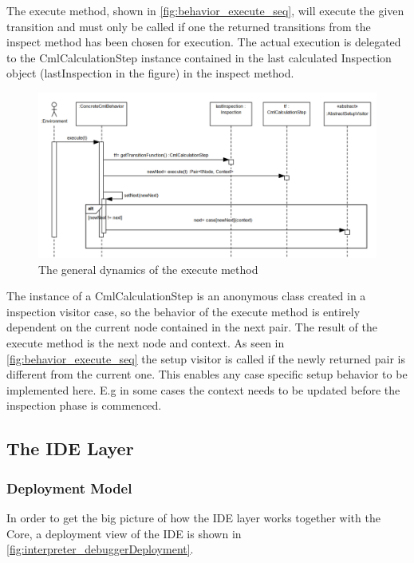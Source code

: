 \documentclass[a4paper, 10pt]{include/compassreport}   %
\begin{document}
The execute method, shown in \autoref{fig:behavior_execute_seq}, will
execute the given transition and must only be called if one the
returned transitions from the inspect method has been chosen for
execution. The actual execution is delegated to the CmlCalculationStep
instance contained in the last calculated Inspection object
(lastInspection in the figure) in the inspect method.
\begin{figure}[ht!]
  \begin{center}
    \includegraphics[width=1\textwidth]{figures/behavior-execute-seq}
    \caption{The general dynamics of the execute method}
    \label{fig:behavior_execute_seq}
  \end{center}
\end{figure}
The instance of a CmlCalculationStep is an anonymous class created in
a inspection visitor case, so the behavior of the execute method is
entirely dependent on the current node contained in the next pair. The
result of the execute method is the next node and context. As seen in
\autoref{fig:behavior_execute_seq} the setup visitor is called if the
newly returned pair is different from the current one. This enables
any case specific setup behavior to be implemented here. E.g in some
cases the context needs to be updated before the inspection phase is
commenced.

\subsection{The IDE Layer}

\subsubsection{Deployment Model}
In order to get the big picture of how the IDE layer works together with the Core, a deployment view of the IDE is shown in \autoref{fig:interpreter_debuggerDeployment}.
\end{document}

